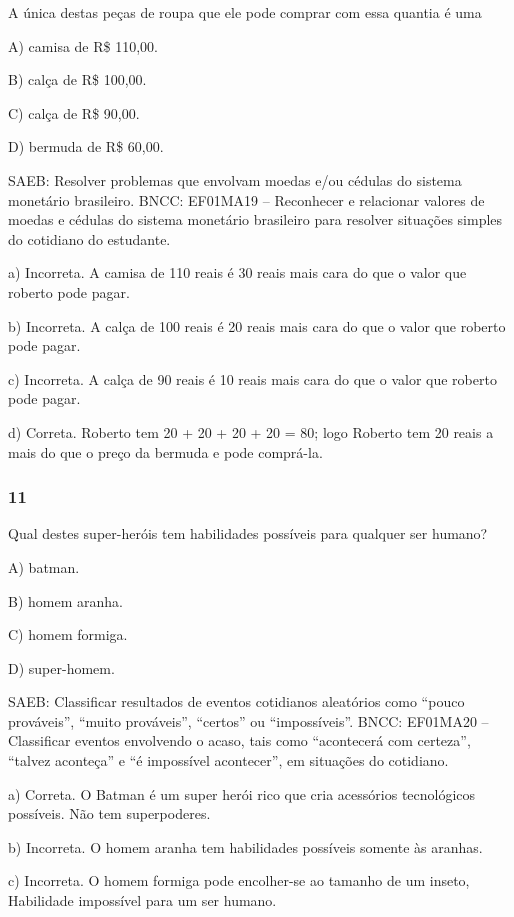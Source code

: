 \begin{itemize}
\begin{itemize}
A única destas peças de roupa que ele pode comprar com essa quantia é uma

A) camisa de R\$ 110,00.

B) calça de R\$ 100,00.

C) calça de R\$ 90,00.

D) bermuda de R\$ 60,00.

SAEB: Resolver problemas que envolvam moedas e/ou cédulas do
sistema monetário brasileiro.
BNCC: EF01MA19 -- Reconhecer e relacionar valores de moedas e cédulas do
sistema monetário brasileiro para resolver situações simples do
cotidiano do estudante.

a) Incorreta. A camisa de 110 reais é 30 reais mais cara do que o valor que
roberto pode pagar.

b) Incorreta. A calça de 100 reais é 20 reais mais cara do que o valor que
roberto pode pagar.

c) Incorreta. A calça de 90 reais é 10 reais mais cara do que o valor que
roberto pode pagar.

d) Correta. Roberto tem 20 + 20 + 20 + 20 = 80; logo Roberto tem 20
reais a mais do que o preço da bermuda e pode comprá-la.

\subsubsection{11}\label{section-127}

Qual destes super-heróis tem habilidades possíveis para qualquer ser humano?

A) batman.

B) homem aranha.

C) homem formiga.

D) super-homem.

SAEB: Classificar resultados de eventos cotidianos aleatórios como
``pouco prováveis'', ``muito prováveis'', ``certos'' ou ``impossíveis''.
BNCC: EF01MA20 -- Classificar eventos envolvendo o acaso, tais como
``acontecerá com certeza'', ``talvez aconteça'' e ``é impossível
acontecer'', em situações do cotidiano.

a) Correta. O Batman é um super herói rico que cria acessórios
tecnológicos possíveis. Não tem superpoderes.

b) Incorreta. O homem aranha tem habilidades possíveis somente às
aranhas.

c) Incorreta. O homem formiga pode encolher-se ao tamanho de um inseto,
Habilidade impossível para um ser humano.


\end{itemize}
\end{itemize}
